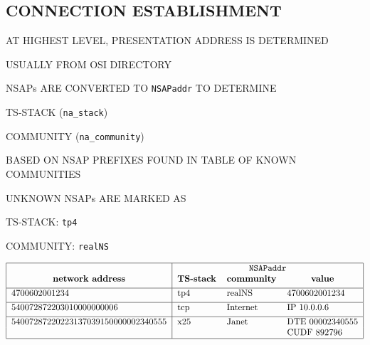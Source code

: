 \begin{bwslide}
\part*	{CONNECTION ESTABLISHMENT}\bf

\begin{nrtc}
\item	AT HIGHEST LEVEL, PRESENTATION ADDRESS IS DETERMINED
    \begin{nrtc}
    \item	USUALLY FROM OSI DIRECTORY
    \end{nrtc}

\item	NSAPs ARE CONVERTED TO \verb"NSAPaddr" TO DETERMINE
    \begin{nrtc}
    \item	TS-STACK (\verb"na_stack")

    \item	COMMUNITY (\verb"na_community")
    \end{nrtc}
    BASED ON NSAP PREFIXES FOUND IN TABLE OF KNOWN COMMUNITIES

\item	UNKNOWN NSAPs ARE MARKED AS
    \begin{nrtc}
    \item	TS-STACK: \verb"tp4"

    \item	COMMUNITY: \verb"realNS" 
    \end{nrtc}
\end{nrtc}
\end{bwslide}


\begin{bwslide}
\small

\[\begin{tabular}{|l|lll|}
\hline
\multicolumn{1}{|c|}{\empty}&
	\multicolumn{3}{c|}{\tt NSAPaddr}\\
\multicolumn{1}{|c|}{\bf network address}&
	\multicolumn{1}{c}{\bf TS-stack}&
		\multicolumn{1}{c}{\bf community}&
			\multicolumn{1}{c|}{\bf value}\\[0.05in]
\hline
4700602001234&
	tp4&	realNS&	4700602001234\\[0.05in]
\hline
540072872203010000000006&
	tcp&	Internet&
			IP 10.0.0.6\\[0.05in]
\hline
54007287220223137039150000002340555&
	x25&	Janet&	DTE 00002340555\\
&	&	&	CUDF 892796\\
\hline
\end{tabular}\]
\end{bwslide}


